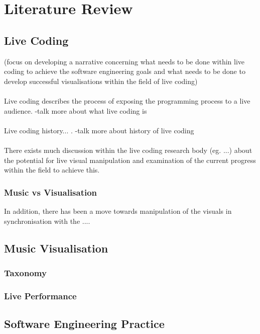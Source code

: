 
\chapter{Literature Review}
\label{cha:literaturereview}

\section{Live Coding}
\label{sec:livecoding}

(focus on developing a narrative concerning what needs to be done within live coding to achieve the software engineering goals and what needs to be done to develop successful visualisations within the field of live coding)
\\\\
Live coding describes the process of exposing the programming process to a live audience. -talk more about what live coding is
\\\\
Live coding history... . -talk more about history of live coding
\\\\
There exists much discussion within the live coding research body (eg. ...) about the potential for live visual manipulation and examination of the current progress within the field to achieve this.


\subsection{Music vs Visualisation}

In addition, there has been a move towards manipulation of the visuals in synchronisation with the ....


\section{Music Visualisation}
\label{sec:musicvisualisation}

\subsection{Taxonomy}

\subsection{Live Performance}


\section{Software Engineering Practice}
\label{sec:softwareengineering}

